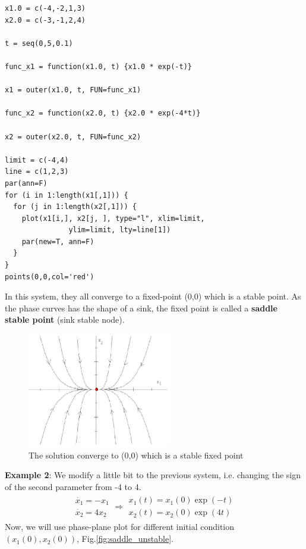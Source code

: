 \begin{lstlisting}
x1.0 = c(-4,-2,1,3)
x2.0 = c(-3,-1,2,4)

t = seq(0,5,0.1)

func_x1 = function(x1.0, t) {x1.0 * exp(-t)}

x1 = outer(x1.0, t, FUN=func_x1)

func_x2 = function(x2.0, t) {x2.0 * exp(-4*t)}

x2 = outer(x2.0, t, FUN=func_x2)

limit = c(-4,4)
line = c(1,2,3)
par(ann=F)
for (i in 1:length(x1[,1])) {
  for (j in 1:length(x2[,1])) {
    plot(x1[i,], x2[j, ], type="l", xlim=limit, 
               ylim=limit, lty=line[1])
    par(new=T, ann=F)
  }
}
points(0,0,col='red')
\end{lstlisting}


In this system, they all converge to a fixed-point (0,0) which is a
stable point. As the phase curves has the shape of a sink, the fixed point is
called a {\bf saddle stable point} (sink stable node).

\begin{figure}[htb]
  \centerline{\includegraphics[height=5cm]{./images/stable_sink_node.eps}}
  \caption{The solution converge to (0,0) which is a stable fixed point}
  \label{fig:saddle_stable}
\end{figure}

{\bf Example 2}: We modify a little bit to the previous system, i.e. changing
the sign of the second parameter from -4 to 4.
\begin{equation}
  \label{eq:1061}
  \begin{split}
    \begin{array}{c}
          \dot{x_1} = -x_1 \\
    \dot{x_2} = 4x_2
    \end{array}
\Rightarrow 
\begin{array}{c}
  x_1(t) = x_1(0) \exp(-t) \\
  x_2(t) = x_2(0) \exp(4t)
\end{array}
  \end{split}
\end{equation}
Now, we will use phase-plane plot for different initial condition
$(x_1(0),x_2(0))$, Fig.\ref{fig:saddle_unstable}.

